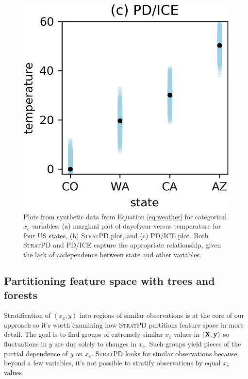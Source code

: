 \documentclass[12pt]{article}
\newcommand{\spd}{\fontfamily{cmr}\textsc{\small StratPD}}
\newcommand{\xnc}{$x_{\overline{c}}$}
\begin{document}
\begin{figure}[htbp]
\begin{center}
\includegraphics[scale=0.7]{images/state_vs_temp_pdp.png}
\caption{Plots from synthetic data from Equation \eqref{eq:weather} for categorical $x_c$ variables: (a) marginal plot of dayofyear versus temperature for four US states, (b) \spd{} plot, and (c) PD/ICE plot. Both \spd{} and PD/ICE capture the appropriate relationship, given the lack of codependence between state and other variables.}
\label{fig:state_vs_temp}
\end{center}
\end{figure}

\subsection{Partitioning feature space with trees and forests}\label{sec:partitioning}

Stratification of $(x_{\overline{c}}, y)$ into regions of similar observations is at the core of our approach so it's worth examining how \spd{} partitions feature space in more detail.  The goal is to find groups of extremely similar \xnc{} values in $({\bf X}, {\bf y})$ so fluctuations in $y$ are due solely to changes in $x_c$. Such groups yield pieces of the partial dependence of $y$ on $x_c$. \spd{} looks for similar observations because, beyond a few variables, it's not possible to stratify observations by equal \xnc{} values. 
\end{document}
